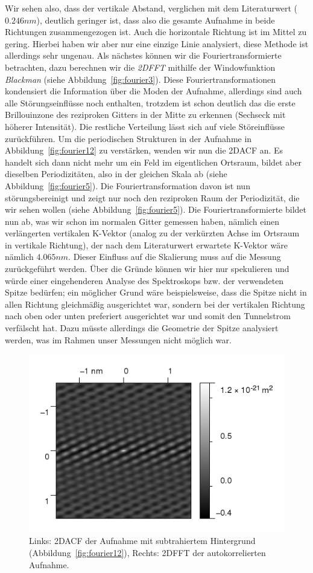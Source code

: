 Wir sehen also, dass der vertikale Abstand, verglichen mit dem Literaturwert ($0.246nm$), deutlich
geringer ist, dass also die gesamte Aufnahme in beide Richtungen zusammengezogen ist. 
Auch die horizontale Richtung ist im Mittel zu gering. Hierbei haben wir aber nur eine einzige
Linie analysiert, diese Methode ist allerdings sehr ungenau. 
Als nächstes können wir die Fouriertransformierte betrachten, dazu
berechnen wir die \textit{2DFFT} mithilfe der Windowfunktion \textit{Blackman} 
(siehe Abbildung~\ref{fig:fourier3}). Diese Fouriertransformationen kondensiert die Information
über die Moden der Aufnahme, allerdings sind auch alle Störungseinflüsse noch enthalten, trotzdem
ist schon deutlich das die erste Brillouinzone des reziproken Gitters in der Mitte zu erkennen
(Sechseck mit höherer Intensität). Die restliche Verteilung lässt sich auf viele Störeinflüsse
zurückführen. Um die periodischen Strukturen in der Aufnahme in Abbildung~\ref{fig:fourier12} zu
verstärken, wenden wir nun die 2DACF an. Es handelt sich dann nicht mehr um ein Feld im 
eigentlichen Ortsraum, bildet aber dieselben Periodizitäten, also in der gleichen Skala ab
(siehe Abbildung~\ref{fig:fourier5}). Die Fouriertransformation davon ist nun störungsbereinigt
und zeigt nur noch den reziproken Raum der Periodizität, die wir sehen wollen
(siehe Abbildung~\ref{fig:fourier5}). Die Fouriertransformierte bildet nun ab, was wir schon
im normalen Gitter gemessen haben, nämlich einen verlängerten vertikalen K-Vektor (analog
zu der verkürzten Achse im Ortsraum in vertikale Richtung), der nach dem Literaturwert 
erwartete K-Vektor wäre nämlich $4.065nm$. Dieser Einfluss auf die Skalierung
muss auf die Messung zurückgeführt werden. Über die Gründe können wir hier nur spekulieren und 
würde einer eingehenderen Analyse des Spektroskops bzw. der verwendeten Spitze bedürfen; 
ein möglicher Grund wäre beispielsweise, dass die Spitze nicht in allen Richtung gleichmäßig 
ausgerichtet war, sondern bei der vertikalen Richtung nach oben oder unten preferiert ausgerichtet
war und somit den Tunnelstrom verfälscht hat. Dazu müsste allerdings die Geometrie der Spitze 
analysiert werden, was im Rahmen unser Messungen nicht möglich war.
\begin{figure}
    \caption{Links: 2DACF der Aufnahme mit
    subtrahiertem Hintergrund (Abbildung~\ref{fig:fourier12}),
    Rechts: 2DFFT der autokorrelierten Aufnahme.}
    \includegraphics[width=0.7 \textwidth]{pics/fourier4}
\end{figure}
